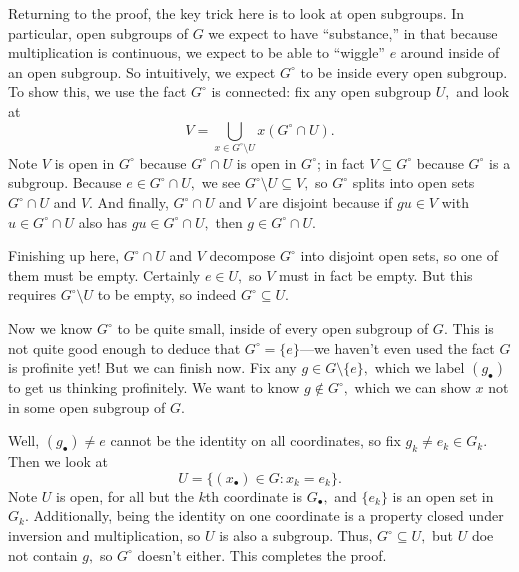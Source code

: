 Returning to the proof, the key trick here is to look at open subgroups. In particular, open subgroups of $G$ we expect to have ``substance,'' in that because multiplication is continuous, we expect to be able to ``wiggle'' $e$ around inside of an open subgroup. So intuitively, we expect $G^\circ$ to be inside every open subgroup. To show this, we use the fact $G^\circ$ is connected: fix any open subgroup $U,$ and look at
\[V=\bigcup_{x\in G^\circ\setminus U}x(G^\circ\cap U).\]
Note $V$ is open in $G^\circ$ because $G^\circ\cap U$ is open in $G^\circ$; in fact $V\subseteq G^\circ$ because $G^\circ$ is a subgroup. Because $e\in G^\circ\cap U,$ we see $G^\circ\setminus U\subseteq V,$ so $G^\circ$ splits into open sets $G^\circ\cap U$ and $V.$ And finally, $G^\circ\cap U$ and $V$ are disjoint because if $gu\in V$ with $u\in G^\circ\cap U$ also has $gu\in G^\circ\cap U,$ then $g\in G^\circ\cap U.$

Finishing up here, $G^\circ\cap U$ and $V$ decompose $G^\circ$ into disjoint open sets, so one of them must be empty. Certainly $e\in U,$ so $V$ must in fact be empty. But this requires $G^\circ\setminus U$ to be empty, so indeed $G^\circ\subseteq U.$

Now we know $G^\circ$ to be quite small, inside of every open subgroup of $G.$ This is not quite good enough to deduce that $G^\circ=\{e\}$---we haven't even used the fact $G$ is profinite yet! But we can finish now. Fix any $g\in G\setminus\{e\},$ which we label $(g_\bullet)$ to get us thinking profinitely. We want to know $g\notin G^\circ,$ which we can show $x$ not in some open subgroup of $G.$

Well, $(g_\bullet)\ne e$ cannot be the identity on all coordinates, so fix $g_k\ne e_k\in G_k.$ Then we look at
\[U=\{(x_\bullet)\in G:x_k=e_k\}.\]
Note $U$ is open, for all but the $k$th coordinate is $G_\bullet,$ and $\{e_k\}$ is an open set in $G_k.$ Additionally, being the identity on one coordinate is a property closed under inversion and multiplication, so $U$ is also a subgroup. Thus, $G^\circ\subseteq U,$ but $U$ doe not contain $g,$ so $G^\circ$ doesn't either. This completes the proof.

